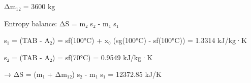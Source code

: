 Δm₁₂ = 3600 kg  

Entropy balance:  
ΔS = m₂ s₂ - m₁ s₁  

s₁ = (TAB - A₂) = sf(100°C) + x₀ (sg(100°C) - sf(100°C)) = 1.3314 kJ/kg·K  

s₂ = (TAB - A₂) = sf(70°C) = 0.9549 kJ/kg·K  

→ ΔS = (m₁ + Δm₁₂) s₂ - m₁ s₁ = 12372.85 kJ/K